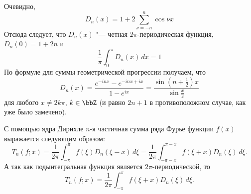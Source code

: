 Очевидно, 
$$
D_n(x) = 1 + 2 \sum_{\nu = -n}^{n} \cos{\nu x}
$$
Отсюда следует, что $D_n(x)$ "--- четная $2\pi$-периодическая функция, $D_n(0) = 1+2n$ и
$$
\frac{1}{\pi}\int_{0}^{\pi} D_n(x) \,dx =1
$$
По формуле для суммы геометрической прогрессии получаем, что
$$
D_n(x) = \frac{e^{-inx} - e^{-inx +ix}}{1-e^{ix}} = 
\frac{\sin(n+\frac{1}{2})x}{\sin{\frac{x}{2}}}
$$
для любого $x\ne 2k\pi$, $k \in \bbZ$ (и равно $2n+1$ в противоположном случае, как уже было замечено).

С помощью ядра Дирихле $n$-я частичная сумма ряда Фурье функции $f(x)$ выражается следующим образом:
$$
T_{n}(f;x) = \frac{1}{2\pi} \int_{-\pi}^{\pi} f(\xi) D_n(\xi-x)\,d\xi = \frac{1}{2\pi} \int_{-\pi-x}^{\pi-x} f(\xi + x) D_n(\xi)\,d\xi.
$$
А так как подынтегральная функция является $2\pi$-периодической, то 
$$
T_{n}(f;x)= \frac{1}{2\pi} \int_{-\pi}^{\pi} f(\xi + x) D_n(\xi)\,d\xi.
$$

